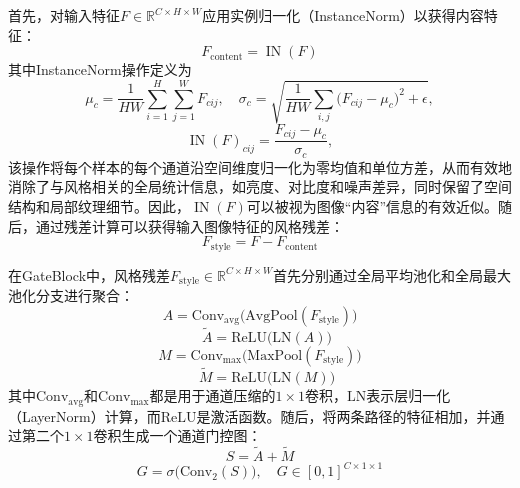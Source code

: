 首先，对输入特征$F\in\mathbb{R}^{C\times H\times W}$应用实例归一化（InstanceNorm）以获得内容特征：
\begin{equation}\label{eq:content}
F_{\mathrm{content}} = \operatorname{IN}(F)
\end{equation}
其中InstanceNorm操作定义为
\begin{equation}
\mu_c = \frac{1}{HW}\sum_{i=1}^{H}\sum_{j=1}^{W}F_{cij},\quad
\sigma_c = \sqrt{\frac{1}{HW}\sum_{i,j}\bigl(F_{cij}-\mu_c\bigr)^2+\epsilon},
\end{equation}
\begin{equation}
\operatorname{IN}(F)_{cij}=\frac{F_{cij}-\mu_c}{\sigma_c},
\end{equation}
该操作将每个样本的每个通道沿空间维度归一化为零均值和单位方差，从而有效地消除了与风格相关的全局统计信息，如亮度、对比度和噪声差异，同时保留了空间结构和局部纹理细节。因此，$\operatorname{IN}(F)$可以被视为图像“内容”信息的有效近似。随后，通过残差计算可以获得输入图像特征的风格残差：
\begin{equation}
F_{\mathrm{style}} = F - F_{\mathrm{content}}
\end{equation}

在GateBlock中，风格残差$F_{\mathrm{style}}\in\mathbb{R}^{C\times H\times W}$首先分别通过全局平均池化和全局最大池化分支进行聚合：
\begin{equation}
A = \mathrm{Conv}_{\mathrm{avg}}\bigl(\mathrm{AvgPool}(F_{\mathrm{style}})\bigr)
\end{equation}
\begin{equation}
\quad\tilde A = \mathrm{ReLU}\bigl(\mathrm{LN}(A)\bigr)
\end{equation}
\begin{equation}
M = \mathrm{Conv}_{\mathrm{max}}\bigl(\mathrm{MaxPool}(F_{\mathrm{style}})\bigr)
\end{equation}
\begin{equation}
\quad\tilde M = \mathrm{ReLU}\bigl(\mathrm{LN}(M)\bigr)
\end{equation}
其中$\mathrm{Conv}_{\mathrm{avg}}$和$\mathrm{Conv}_{\mathrm{max}}$都是用于通道压缩的$1\times1$卷积，$\mathrm{LN}$表示层归一化（LayerNorm）计算，而$\mathrm{ReLU}$是激活函数。随后，将两条路径的特征相加，并通过第二个$1\times1$卷积生成一个通道门控图：
\begin{equation}
S = \tilde A + \tilde M
\end{equation}
\begin{equation}
G = \sigma\bigl(\mathrm{Conv}_2(S)\bigr),\quad G\in[0,1]^{C\times1\times1}
\end{equation}

